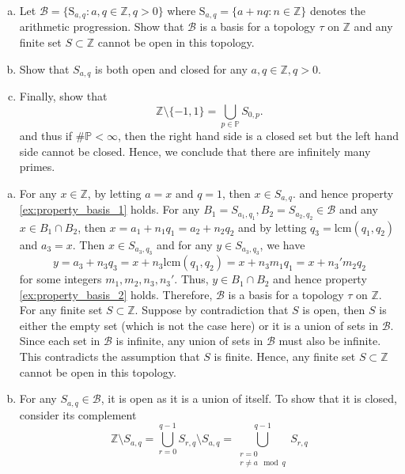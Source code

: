 \documentclass{elegantbook}
\begin{document}
\begin{problemset}[Exercises]
  \begin{enumerate}[(a)]
    \item Let $\mathcal{B} = \{\mathrm{S}_{a, q}: a, q \in \mathbb{Z}, q > 0\}$ where $\mathrm{S}_{a, q} = \{a + nq: n \in \mathbb{Z}\}$ denotes the arithmetic progression. Show that $\mathcal{B}$ is a basis for a topology $\tau$ on $\mathbb{Z}$ and any finite set $S \subset \mathbb{Z}$ cannot be open in this topology.
    \item Show that $S_{a,q}$ is both open and closed for any $a, q \in \mathbb{Z}, q > 0$.
    \item Finally, show that
    \[
      \mathbb{Z} \setminus \{-1, 1\} = \bigcup_{p \in \mathbb{P}} S_{0, p}.
    \]
    and thus if $\#\mathbb{P}<\infty$, then the right hand side is a closed set but the left hand side cannot be closed. Hence, we conclude that there are infinitely many primes.
  \end{enumerate}
  \begin{solution}
    \begin{enumerate}[(a)]
      \item For any $x \in \mathbb{Z}$, by letting $a = x$ and $q = 1$, then $x \in S_{a, q}$. and hence property \ref{ex:property_basis_1} holds. For any $B_1 = S_{a_1, q_1}, B_2 = S_{a_2, q_2} \in \mathcal{B}$ and any $x \in B_1 \cap B_2$, then $x=a_1 + n_1 q_1 = a_2 + n_2 q_2$ and by letting $q_3 = \mathrm{lcm}(q_1, q_2)$ and $a_3 = x$. Then $x \in S_{a_3, q_3}$ and for any $y \in S_{a_3, q_3}$, we have
      \[
        y = a_3 + n_3 q_3 = x + n_3 \mathrm{lcm}(q_1, q_2)=x+ n_3 m_1 q_1 = x + n_3' m_2 q_2
      \]
      for some integers $m_1, m_2, n_3, n_3'$. Thus, $y \in B_1 \cap B_2$ and hence property \ref{ex:property_basis_2} holds. Therefore, $\mathcal{B}$ is a basis for a topology $\tau$ on $\mathbb{Z}$. \\
      For any finite set $S \subset \mathbb{Z}$. Suppose by contradiction that $S$ is open, then $S$ is either the empty set (which is not the case here) or it is a union of sets in $\mathcal{B}$. Since each set in $\mathcal{B}$ is infinite, any union of sets in $\mathcal{B}$ must also be infinite. This contradicts the assumption that $S$ is finite. Hence, any finite set $S \subset \mathbb{Z}$ cannot be open in this topology.
      \item For any $S_{a, q} \in \mathcal{B}$, it is open as it is a union of itself. To show that it is closed, consider its complement
      \[
        \mathbb{Z} \setminus S_{a, q}= \bigcup_{r=0}^{q-1} S_{r, q} \setminus S_{a, q}= \bigcup_{\substack{r=0 \\ r \ne a \mod q}}^{q-1} S_{r, q}
\]
\end{enumerate}
\end{solution}
\end{problemset}
\end{document}
